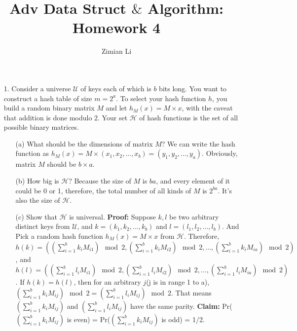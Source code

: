 \documentclass{article}       %
\title{Adv Data Struct $\&$ Algorithm: Homework 4}
\author{Zimian Li}
\begin{document}
        
\maketitle
\begin{enumerate}
	\item[1.] Consider a universe $\mathcal{U}$ of keys each of which is $b$ bits long. You want to construct a hash table of size $m=2^a$. To select your hash function $h$, you build a random binary matrix $M$ and let $h_M(x)=M\times x$, with the caveat that addition is done modulo 2. Your set $\mathcal{H}$ of hash functions is the set of all possible binary matrices.
	\begin{enumerate}
		\item[(a)] What should be the dimensions of matrix $M$?\newline\newline
		We can write the hash function as $h_M(x)=M\times (x_1,x_2, ..., x_b) = (y_1, y_2, ..., y_a)$. Obviously, matrix $M$ should be $b\times a$.\newline
		\item[(b)] How big is $\mathcal{H}$?\newline\newline
		Because the size of $M$ is $ba$, and every element of it could be 0 or 1, therefore, the total number of all kinds of $M$ is $2^{ba}$. It's also the size of $\mathcal{H}$.\newline
		\item[(c)] Show that $\mathcal{H}$ is universal.\newline\newline
		\textbf{Proof:} Suppose $k, l$ be two arbitrary distinct keys from $\mathcal{U}$, and $k = (k_1, k_2, ..., k_b)$ and $l = (l_1, l_2, ..., l_b)$. And Pick a random hash function $h_M(x)=M\times x$ from $\mathcal{H}$.\newline
		Therefore, $h(k) = ((\sum_{i=1}^{b} k_iM_{i1}) \mod 2, (\sum_{i=1}^{b} k_iM_{i2}) \mod 2, ..., (\sum_{i=1}^{b} k_iM_{ia}) \mod 2)$, and $h(l) = ((\sum_{i=1}^{b} l_iM_{i1}) \mod 2, (\sum_{i=1}^{b} l_iM_{i2}) \mod 2, ..., (\sum_{i=1}^{b} l_iM_{ia}) \mod 2)$. If $h(k)=h(l)$, then for an arbitrary $j$(j is in range 1 to a), $(\sum_{i=1}^{b} k_iM_{ij}) \mod 2 = (\sum_{i=1}^{b} l_iM_{ij}) \mod 2$. That means $(\sum_{i=1}^{b} k_iM_{ij})$ and  $(\sum_{i=1}^{b} l_iM_{ij})$ have the same parity.\newline
		\textbf{Claim:} Pr($(\sum_{i=1}^{b} k_iM_{ij})$ is even) = Pr($(\sum_{i=1}^{b} k_iM_{ij})$ is odd) = 1/2.\newline

\end{enumerate}
\end{enumerate}
\end{document}
